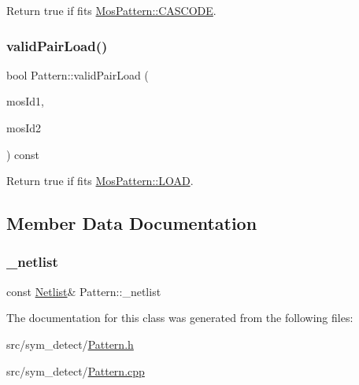 Return true if fits \hyperlink{type_8h_af19eddb079bfea723256710b029c38e8aac50017227efb09ec529757764e5187c}{Mos\+Pattern\+::\+C\+A\+S\+C\+O\+DE}. 

\mbox{\label{classPattern_acae638957d000c1a163f949c369d5ef4}} 
\subsubsection{\texorpdfstring{valid\+Pair\+Load()}{validPairLoad()}}
{\footnotesize\ttfamily bool Pattern\+::valid\+Pair\+Load (\begin{DoxyParamCaption}\item[{\hyperlink{type_8h_a581e8093e28e7362f2b6937296190676}{Index\+Type}}]{mos\+Id1,  }\item[{\hyperlink{type_8h_a581e8093e28e7362f2b6937296190676}{Index\+Type}}]{mos\+Id2 }\end{DoxyParamCaption}) const\hspace{0.3cm}{\ttfamily [private]}}



Return true if fits \hyperlink{type_8h_af19eddb079bfea723256710b029c38e8a615d2885ef7576cedd9aafbb2578f028}{Mos\+Pattern\+::\+L\+O\+AD}. 



\subsection{Member Data Documentation}
\mbox{\label{classPattern_a71ec4e16ee6088587cece41cb7b027a3}} 
\subsubsection{\texorpdfstring{\+\_\+netlist}{\_netlist}}
{\footnotesize\ttfamily const \hyperlink{classNetlist}{Netlist}\& Pattern\+::\+\_\+netlist\hspace{0.3cm}{\ttfamily [private]}}



The documentation for this class was generated from the following files\+:\begin{DoxyCompactItemize}
\item 
src/sym\+\_\+detect/\hyperlink{Pattern_8h}{Pattern.\+h}\item 
src/sym\+\_\+detect/\hyperlink{Pattern_8cpp}{Pattern.\+cpp}\end{DoxyCompactItemize}
